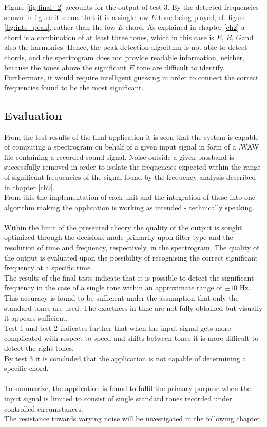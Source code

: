 Figure \ref{fig:final_2} accounts for the output of test 3. By the detected frequencies shown in figure \label{fig:final_peak2} it seems that it is a single low $E$ tone being played, cf. figure \ref{fig:inte_peak}, rather than the low $E$ chord. As explained in chapter \ref{ch2} a chord is a combination of at least three tones, which in this case is $E$, $B$, $G$\hashsharp and also the harmonics. Hence, the peak detection algorithm is not able to detect chords, and the spectrogram does not provide readable information, neither, because the tones above the significant $E$ tone are difficult to identify. Furthermore, it would require intelligent guessing in order to connect the correct frequencies found to be the most significant. 

\subsection{Evaluation}
From the test results of the final application it is seen that the system is capable of computing a spectrogram on behalf of a given input signal in form of a .WAW file containing a recorded sound signal. Noise outside a given passband is successfully removed in order to isolate the frequencies expected within the range of significant frequencies of the signal found by the frequency analysis described in chapter \ref{ch9}. \\
From this the implementation of each unit and the integration of these into one algorithm making the application is working as intended - technically speaking. \\
\\
Within the limit of the presented theory the quality of the output is sought optimized through the decisions made primarily upon filter type and the resolution of time and frequency, respectively, in the spectrogram.
The quality of the output is evaluated upon the possibility of recognising the correct significant frequency at a specific time. \\
The results of the final tests indicate that it is possible to detect the significant frequency in the case of a single tone within an approximate range of $\pm 10$ Hz. This accuracy is found to be sufficient under the assumption that only the standard tones are used. The exactness in time are not fully obtained but visually it appears sufficient. \\        
Test 1 and test 2 indicates further that when the input signal gets more complicated with respect to speed and shifts between tones it is more difficult to detect the right tones. \\
By test 3 it is concluded that the application is not capable of determining a specific chord. \\   
\\
To summarize, the application is found to fulfil the primary purpose when the input signal is limited to consist of single standard tones recorded under controlled circumstances. \\
The resistance towards varying noise will be investigated in the following chapter.           